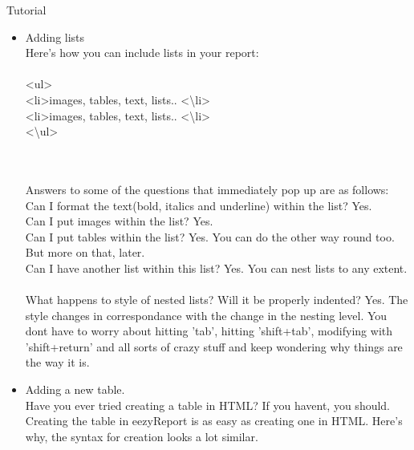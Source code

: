 \documentclass{report}
\begin{document}
\begin{projChapter}{Tutorial}
\begin{itemize}
  \item Adding lists
                ~\\
                Here's how you can include lists in your report:
                ~\\\\ \textless ul\textgreater 
                ~\\    \textless li\textgreater  images, tables, text, lists.. \textless \textbackslash li\textgreater 
                ~\\    \textless li\textgreater  images, tables, text, lists.. \textless \textbackslash li\textgreater 
                ~\\ \textless \textbackslash ul\textgreater 

                ~\\\\ Answers to some of the questions that immediately pop up are as follows:
                ~\\ Can I format the text(bold, italics and underline) within the list? Yes.
                ~\\ Can I put images within the list? Yes.
                ~\\ Can I put tables within the list? Yes. You can do the other way round too. But more on that, later.
                ~\\ Can I have another list within this list? Yes. You can nest lists to any extent.
                ~\\ What happens to style of nested lists? Will it be properly indented? Yes. The style changes in correspondance with the change in the nesting level. You dont have to worry about hitting 'tab', hitting 'shift+tab', modifying with 'shift+return' and all sorts of crazy stuff and keep wondering why things are the way it is.
            
  \item Adding a new table.
                ~\\ Have you ever tried creating a table in HTML? If you havent, you should. Creating the table in eezyReport is as easy as creating one in HTML. Here's why, the syntax for creation looks a lot similar.


\end{itemize}
\end{projChapter}
\end{document}
